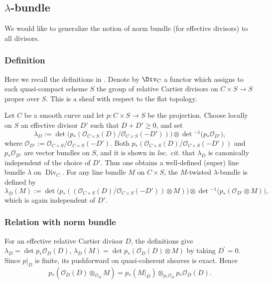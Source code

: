 \documentclass{amsart}
\numberwithin{equation}{section}
\numberwithin{figure}{section}
\theoremstyle{definition}
\theoremstyle{remark}
\renewcommand{\c}[1]{\mathcal{#1}}
\begin{document}
\subsection{$\lambda$-bundle}
We would like to generalize the notion of norm bundle (for effective divisors) to all divisors. 
\subsubsection{Definition}\label{defn-lambdabundle}
Here we recall the definitions in \cite[3.10.7]{beilinson2004chiral}.
Denote by $\Div_C$ a functor which assigns to each quasi-compact scheme $S$ the group of relative Cartier divisors on $C\times S\to S$ proper over $S$. This is a sheaf with respect to the flat topology.

Let $C$ be a smooth curve and let $p:C\times S\to S$ be the projection. Choose locally on $S$ an effective divisor $D'$ such that $D+D'\ge 0$, and set
\[
\lambda_D
:=
\det\bigl(p_{*}(\mathcal O_{C\times S}(D)/\mathcal O_{C\times S}(-D'))\bigr)
\otimes
\det\!^{-1}\bigl(p_{*}\mathcal O_{D'}\bigr),
\]
where $\mathcal O_{D'}:=\mathcal O_{C\times S}/\mathcal O_{C\times S}(-D')$. 
Both $p_{*}(\mathcal O_{C\times S}(D)/\mathcal O_{C\times S}(-D'))$ and $p_{*}\mathcal O_{D'}$ are vector bundles on $S$, 
and it is shown in \textit{loc. cit.} that $\lambda_D$ is canonically independent 
of the choice of $D'$. Thus one obtains a well-defined (super) line bundle $\lambda$ on 
$\operatorname{Div}_C$. 
For any line bundle $M$ on $C\times S$, the $M$-twisted $\lambda$-bundle is defined by
\[
\lambda_D(M)
:=
\det\bigl(p_{*}((\mathcal O_{C\times S}(D)/\mathcal O_{C\times S}(-D'))\otimes M)\bigr)
\otimes
\det\!^{-1}\bigl(p_{*}(\mathcal O_{D'}\otimes M)\bigr),
\]
which is again independent of $D'$. 

\subsubsection{Relation with norm bundle}
For an effective relative Cartier divisor $D$, the definitions give $\lambda_{D}=\det p_* \c O_D(D)$, $\lambda_D(M)=\det p_*(\c O_D(D)\otimes M)$ by taking $D^\prime=0$. Since $p|_D$ is finite, its pushforward on  quasi-coherent sheaves is exact. Hence $$p_*(\c O_D(D)\otimes_{\c O_D} M)=p_* \left(M|_D \right)\otimes_{p_*\c O_D}p_*\c O_D(D).$$
\end{document}
